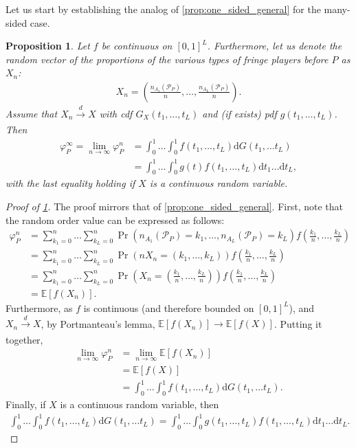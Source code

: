 \documentclass[a4paper]{article}
\newtheorem{proposition}{Proposition}
\newcommand{\dt}{\mathrm{d}t}
\newcommand{\E}{\mathbb{E}}
\begin{document}
Let us start by establishing the analog of \cref{prop:one_sided_general} for the many-sided case.
\begin{proposition}
    \label{prop:many_sided_general}
    Let $f$ be continuous on $[0, 1]^L$. Furthermore, let us denote the random vector of the proportions of the various types of fringe players before $P$ as $X_n$:
    \begin{align*}
        X_n = \left( \frac{n_{A_1}(\mathcal{P}_P)}{n}, \dots, \frac{n_{A_L}(\mathcal{P}_P)}{n} \right).
    \end{align*}
    Assume that $X_n \xrightarrow[]{d} X$ with cdf $G_X(t_1, \dots, t_L)$ and (if exists) pdf $g(t_1, \dots, t_L)$.
    Then
    \begin{align*}
        \varphi_P^\infty = \lim_{n \to \infty} \varphi_P^n &= \int_0^1 \dots \int_0^1 f(t_1, \dots, t_L) \mathrm{d}G(t_1, \dots t_L) \\
        &= \int_0^1\dots \int_0^1 g(t) f(t_1, \dots, t_L) \dt_1 \dots \dt_L,
    \end{align*}
    with the last equality holding if $X$ is a continuous random variable.
\end{proposition}

\begin{proof}[Proof of \cref{prop:many_sided_general}]
    The proof mirrors that of \cref{prop:one_sided_general}.
    First, note that the random order value can be expressed as follows:
    \begin{align*}
        \varphi_P^n &= \sum_{k_1=0}^n \dots \sum_{k_L=0}^n \Pr(n_{A_1}(\mathcal{P}_P) = k_1, \dots, n_{A_L}(\mathcal{P}_P) = k_L) f\left(\frac{k_1}{n}, \dots, \frac{k_L}{n}\right) \\
        &= \sum_{k_1=0}^n \dots \sum_{k_L=0}^n \Pr(n X_n = (k_1, \dots, k_L)) f\left(\frac{k_1}{n}, \dots, \frac{k_L}{n}\right) \\
        &= \sum_{k_1=0}^n \dots \sum_{k_L=0}^n \Pr \left( X_n = \left(\frac{k_1}{n}, \dots, \frac{k_L}{n}\right) \right) f \left(\frac{k_1}{n}, \dots, \frac{k_L}{n}\right) \\
        &= \E[f(X_n)].
    \end{align*}
    Furthermore, as $f$ is continuous (and therefore bounded on $[0, 1]^L$), and $X_n \xrightarrow[]{d} X$, by Portmanteau's lemma, $\E[f(X_n)] \to \E[f(X)]$.
    Putting it together,
    \begin{align*}
        \lim_{n \to \infty} \varphi_P^n &= \lim_{n \to \infty} \E[f(X_n)] \\
        &= \E[f(X)] \\
        &= \int_0^1 \dots \int_0^1 f(t_1, \dots, t_L) \mathrm{d}G(t_1, \dots t_L).
    \end{align*}
    Finally, if $X$ is a continuous random variable, then
    \begin{align*}
        \int_0^1 \dots \int_0^1 f(t_1, \dots, t_L) \mathrm{d}G(t_1, \dots t_L) = \int_0^1\dots \int_0^1 g(t_1, \dots, t_L) f(t_1, \dots, t_L) \dt_1 \dots \dt_L.
    \end{align*}
\end{proof}
\end{document}
